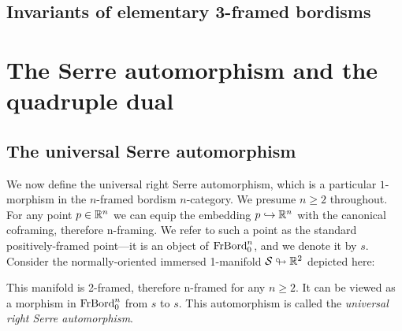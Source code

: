 \documentclass{amsart}
\begin{document}
\subsection{Invariants of elementary 3-framed bordisms}




\section{The Serre automorphism and the quadruple dual} \label{sec-serre}


\subsection{The universal Serre automorphism}
We now define the universal right Serre automorphism, which is a particular $1$-morphism in the $n$-framed bordism $n$-category.  We presume $n \geq 2$ throughout.  For any point $p \in \mathbb R^n$ we can equip the embedding $p \hookrightarrow \mathbb R^n$ with the canonical coframing, therefore n-framing.  We refer to such a point as the standard positively-framed point---it is an object of $\mathrm{FrBord}_0^n$, and we denote it by $s$.  Consider the normally-oriented immersed 1-manifold $\mathcal S \looparrowright \mathbb R^2$ depicted here:
\begin{center}
\end{center}
\nid This manifold is 2-framed, therefore n-framed for any $n \geq 2$.  It can be viewed as a morphism in $\mathrm{FrBord}_0^n$ from $s$ to $s$.  This automorphism is called the \emph{universal right Serre automorphism}.  
\end{document}
